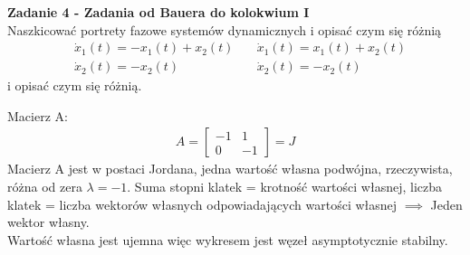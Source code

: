 \documentclass[a4paper,11pt]{article}
\begin{document}
\newpage
\begin{framed}
\textbf{Zadanie 4 - Zadania od Bauera do kolokwium I } \\ 
Naszkicować portrety fazowe systemów dynamicznych i opisać czym się różnią
\begin{align*}
&\dot{x}_{1}(t)=-x_{1}(t)+x_{2}(t) \quad &\dot{x}_{1}(t)=x_{1}(t)+x_{2}(t) \\
&\dot{x}_{2}(t)=-x_{2}(t) \quad &\dot{x}_{2}(t)=-x_{2}(t) 
\end{align*}
i opisać czym się różnią.
\end{framed}
Macierz A:
\begin{align*}
A =
\begin{bmatrix}
-1 & 1 \\
0 & -1
\end{bmatrix} = J
\end{align*}
Macierz A jest w postaci Jordana, jedna wartość własna podwójna, rzeczywista, różna od zera \( \lambda = -1 \). Suma stopni klatek = krotność wartości własnej, liczba klatek = liczba wektorów własnych odpowiadających wartości własnej \( \implies \) Jeden wektor własny. \\
Wartość własna jest ujemna więc wykresem jest węzeł asymptotycznie stabilny. 
\end{document}
